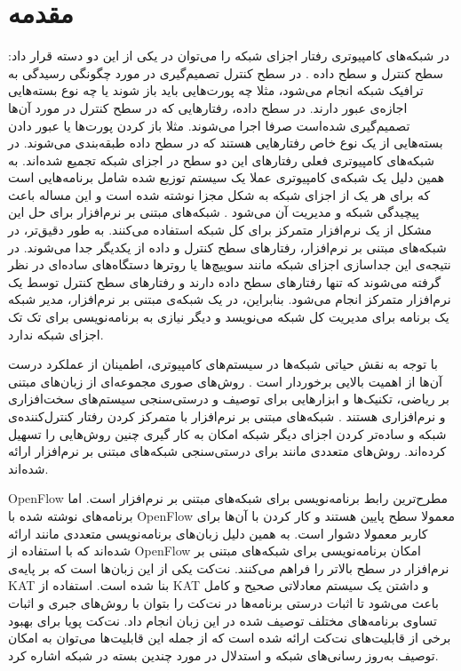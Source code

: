 \chapter{مقدمه}
در شبکه‌های کامپیوتری رفتار اجزای شبکه‌ را می‌توان در یکی از این دو دسته قرار داد:
سطح کنترل%
 و سطح داده%
.
در سطح کنترل تصمیم‌گیری در مورد چگونگی رسیدگی به ترافیک شبکه انجام می‌شود، مثلا چه پورت‌هایی باید باز شوند یا چه نوع بسته‌هایی اجازه‌ی عبور دارند.
در سطح داده، رفتار‌هایی که در سطح کنترل در مورد آن‌ها تصمیم‌گیری شده‌است صرفا اجرا می‌شوند. 
مثلا باز کردن پورت‌ها یا عبور دادن بسته‌هایی از یک نوع خاص 
رفتار‌هایی هستند که در سطح داده طبقه‌‌بندی می‌شوند.
در شبکه‌های کامپیوتری فعلی رفتار‌های این دو سطح در اجزای شبکه تجمیع شده‌اند.
به همین دلیل یک شبکه‌ی کامپیوتری عملا یک سیستم توزیع شده‌ شامل برنامه‌هایی است که برای هر یک از اجزای شبکه به شکل مجزا نوشته شده است و این مساله باعث پیچیدگی شبکه‌ و مدیریت آن‌‌ می‌شود
\cite{sdn-survey}.
شبکه‌های مبتنی بر نرم‌افزار%
برای حل این مشکل از یک نرم‌افزار متمرکز برای کل‌ شبکه استفاده می‌کنند.
به طور دقیق‌تر، در شبکه‌های مبتنی بر نرم‌افزار، رفتار‌های سطح کنترل و داده از یکدیگر جدا می‌شوند. 
در نتیجه‌ی این جداسازی اجزای شبکه مانند سوییچ‌ها یا روترها دستگاه‌های ساده‌ای در نظر گرفته می‌شوند که تنها رفتار‌های سطح داده دارند و رفتار‌های سطح کنترل توسط یک نرم‌افزار متمرکز انجام می‌شود.
بنابراین، در یک شبکه‌ی مبتنی بر نرم‌افزار، مدیر شبکه یک برنامه برای مدیریت کل شبکه می‌نویسد و دیگر نیازی به برنامه‌نویسی برای تک تک اجزای شبکه ندارد.

با توجه به نقش حیاتی شبکه‌ها در سیستم‌های کامپیوتری، اطمینان از عملکرد درست آن‌ها از اهمیت بالایی برخوردار است 
\cite{foerster2018survey}.
روش‌های صوری%
مجموعه‌ای از زبان‌های مبتنی بر ریاضی، تکنیک‌ها و ابزار‌هایی برای توصیف و درستی‌سنجی سیستم‌های سخت‌افزاری و نرم‌افزاری هستند
\cite{clarke1996formal}.
شبکه‌های مبتنی بر نرم‌افزار با متمرکز کردن رفتار کنترل‌کننده‌ی شبکه و ساده‌تر کردن اجزای دیگر شبکه امکان به کار گیری چنین روش‌هایی را تسهیل کرده‌اند.
روش‌های متعددی مانند
\cite{al2010flowchecker,khurshid2013veriflow,not-nice,zeng2014libra}
برای درستی‌سنجی شبکه‌های مبتنی بر نرم‌افزار ارائه شده‌اند.

OpenFlow
\cite{mckeown2008openflow}
مطرح‌ترین رابط برنامه‌نویسی%
برای شبکه‌های مبتنی بر نرم‌افزار است.
اما برنامه‌های نوشته شده با 
OpenFlow
معمولا سطح پایین هستند و کار کردن با آن‌ها برای کاربر معمولا دشوار است. 
به همین دلیل زبان‌های برنامه‌نویسی متعددی مانند
\cite{foster2011frenetic,voellmy2011nettle,netcore,procera,pyretic,netkat}
ارائه شده‌اند
که با استفاده از 
OpenFlow
امکان برنامه‌نویسی برای شبکه‌های مبتنی بر نرم‌افزار در سطح بالاتر را فراهم می‌کنند.
نت‌کت یکی از این زبان‌ها است%
 \cite{netkat} که بر پایه‌ی
KAT \cite{kat}
بنا شده است.
استفاده از 
KAT
و داشتن یک سیستم معادلاتی صحیح%
و کامل%
باعث می‌شود تا اثبات درستی برنامه‌ها در نت‌کت را بتوان با روش‌های جبری و اثبات تساوی برنامه‌های مختلف توصیف شده در این زبان انجام داد.
نت‌کت پویا%
\cite{dynetkat}
برای بهبود برخی از قابلیت‌های نت‌کت ارائه شده است که از جمله این قابلیت‌ها می‌توان به امکان توصیف به‌روز رسانی‌های شبکه و استدلال در مورد چندین بسته در شبکه اشاره کرد.

